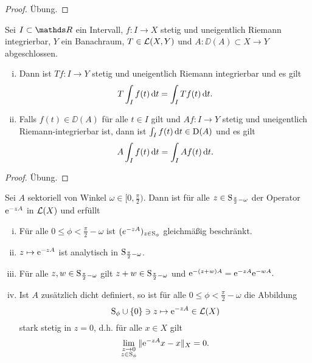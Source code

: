 \begin{proof}
  Übung.
\end{proof}

\begin{prop}
  \label{prop:opInIntegral}
  Sei $I \subset \R$ ein Intervall, $f \colon I \to X$ stetig und uneigentlich Riemann integrierbar, $Y$ ein Banachraum, $T \in \mathcal{L}(X,Y)$ und $A \colon \DD(A) \subset X \to Y$ abgeschlossen.
  \begin{enumerate}[(i)]
    \item Dann ist $Tf \colon I \to Y$ stetig und uneigentlich Riemann integrierbar und es gilt
      $$
      T \int_I f(t) \, {\operatorname{d}\!{t}} = \int_I Tf(t)\, {\operatorname{d}\!{t}}.
      $$
    \item Falls $f(t) \in \DD(A)$ für alle $t \in I$ gilt und $Af \colon I \to Y$ stetig und uneigentlich Riemann-integrierbar ist, dann ist $\int_I f(t) \, {\operatorname{d}\!{t}} \in \mathrm{D}(A)$ und es gilt 
      $$
      A \int_I f(t) \, {\operatorname{d}\!{t}} = \int_I A f(t) \, {\operatorname{d}\!{t}}.
      $$
  \end{enumerate}
\end{prop}

\begin{proof}
  Übung.
\end{proof}

\begin{thm}
  Sei $A$ sektoriell von Winkel $\omega \in [0,\frac{\pi}{2})$.
    Dann ist für alle $z \in \mathrm{S}_{\frac{\pi}{2} - \omega}$ der Operator $\mathrm{e}^{-zA}$ in $\mathcal{L}(X)$ und erfüllt
    \begin{enumerate}[(i)]
      \item Für alle $0 \leq \phi < \frac{\pi}{2} - \omega$ ist $(e^{-zA})_{z \in \mathrm{S}_\phi}$ gleichmäßig beschränkt.
      \item $z \mapsto \mathrm{e}^{-zA}$ ist analytisch in $\mathrm{S}_{\frac{\pi}{2} - \omega}$.
      \item Für alle $z,w \in \mathrm{S}_{\frac{\pi}{2} - \omega}$ gilt $z + w \in \mathrm{S}_{\frac{\pi}{2} - \omega}$ und
        $
        \mathrm{e}^{-(z + w)A} = \mathrm{e}^{-zA}\mathrm{e}^{-w A}.
        $
      \item Ist $A$ zusätzlich dicht definiert, so ist für alle $0 \leq \phi < \frac{\pi}{2} - \omega$ die Abbildung
        $$
        \mathrm{S}_\phi \cup \{0\} \ni z \mapsto \mathrm{e}^{-z A} \in \mathcal{L}(X)
        $$
        stark stetig in $z = 0$, d.h. für alle $x \in X$ gilt
        $$
        \lim_{\substack{z \to 0 \\ z \in \mathrm{S}_\phi}} \|\mathrm{e}^{-zA} x - x\|_X = 0.
        $$
    \end{enumerate}
\end{thm}

